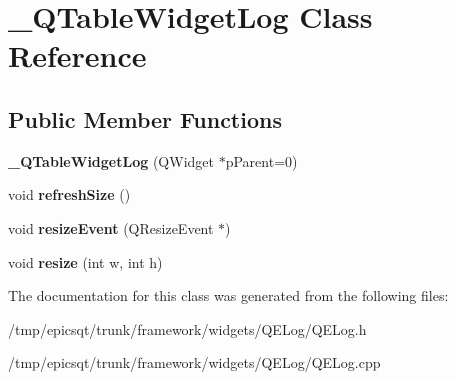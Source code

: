 \hypertarget{class__QTableWidgetLog}{
\section{\_\-QTableWidgetLog Class Reference}
\label{class__QTableWidgetLog}
}
\subsection*{Public Member Functions}
\begin{DoxyCompactItemize}
\item 
\hypertarget{class__QTableWidgetLog_a1a6408aa3584d4eeabdeffd20e423c5d}{
{\bfseries \_\-QTableWidgetLog} (QWidget $\ast$pParent=0)}
\label{class__QTableWidgetLog_a1a6408aa3584d4eeabdeffd20e423c5d}

\item 
\hypertarget{class__QTableWidgetLog_ae9e2e7a63f18a00d2a7a04bf396712aa}{
void {\bfseries refreshSize} ()}
\label{class__QTableWidgetLog_ae9e2e7a63f18a00d2a7a04bf396712aa}

\item 
\hypertarget{class__QTableWidgetLog_a8fe5b8768575a2bcae89df6d25129000}{
void {\bfseries resizeEvent} (QResizeEvent $\ast$)}
\label{class__QTableWidgetLog_a8fe5b8768575a2bcae89df6d25129000}

\item 
\hypertarget{class__QTableWidgetLog_a5dfb67d6c28366cd4ec17cbe17113d56}{
void {\bfseries resize} (int w, int h)}
\label{class__QTableWidgetLog_a5dfb67d6c28366cd4ec17cbe17113d56}

\end{DoxyCompactItemize}


The documentation for this class was generated from the following files:\begin{DoxyCompactItemize}
\item 
/tmp/epicsqt/trunk/framework/widgets/QELog/QELog.h\item 
/tmp/epicsqt/trunk/framework/widgets/QELog/QELog.cpp\end{DoxyCompactItemize}
